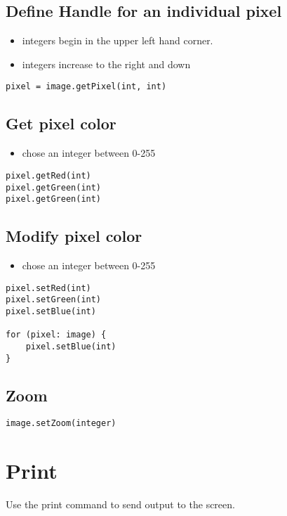 \documentclass{article}
\begin{document}
\subsection{Define Handle for an individual pixel}
    \begin{itemize}
      \item integers begin in the upper left hand corner.
      \item integers increase to the right and down
    \end{itemize}
\begin{lstlisting}
pixel = image.getPixel(int, int)
\end{lstlisting}

\subsection{Get pixel color}
\begin{itemize}
  \item chose an integer between 0-255
\end{itemize}

\begin{lstlisting}
pixel.getRed(int)
pixel.getGreen(int)
pixel.getGreen(int)
\end{lstlisting}

\subsection{Modify pixel color}
\begin{itemize}
  \item chose an integer between 0-255
\end{itemize}
\begin{lstlisting}
pixel.setRed(int)
pixel.setGreen(int)
pixel.setBlue(int)

for (pixel: image) {
    pixel.setBlue(int)
}
\end{lstlisting}

\subsection{Zoom}
\begin{lstlisting}
image.setZoom(integer)
\end{lstlisting}

\section{Print}
Use the print command to send output to the screen.
\end{document}
